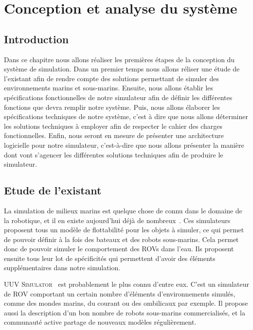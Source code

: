 \chapter{Conception et analyse du système}
\label{chapitre:systeme}

    \section{Introduction}

        Dans ce chapitre nous allons réaliser les premières étapes de la conception du système de simulation. Dans un premier temps nous allons réliser une étude de l'existant afin de rendre compte des solutions permettant de simuler des environnements marins et sous-marins. Ensuite, nous allons établir les spécifications fonctionnelles de notre simulateur afin de définir les différentes fonctions que devra remplir notre système. Puis, nous allons élaborer les spécifications techniques de notre système, c'est à dire que nous allons déterminer les solutions techniques à employer afin de respecter le cahier des charges fonctionnelles. Enfin, nous seront en mesure de présenter une architecture logicielle pour notre simulateur, c'est-à-dire que nous allons présenter la manière dont vont s'agencer les différentes solutions techniques afin de produire le simulateur.

    \section{Etude de l'existant}

        La simulation de milieux marins est quelque chose de connu dans le domaine de la robotique, et il en existe aujourd'hui déjà de nombreux~\cite{Manhaes_2016, bingham19toward, MARS, Rock}. Ces simulateurs proposent tous un modèle de flottabilité pour les objets à simuler, ce qui permet de pouvoir définir à la fois des bateaux et des robots sous-marins. Cela permet donc de pouvoir simuler le comportement des \gls{ROV}s dans l'eau. Ils proposent ensuite tous leur lot de spécificités qui permettent d'avoir des éléments supplémentaires dans notre simulation.
        
        \textsc{UUV Simulator}~\cite{Manhaes_2016} est probablement le plus connu d'entre eux. C'est un simulateur de \gls{ROV} comportant un certain nombre d'éléments d'environnements simulés, comme des mondes marins, du courant ou des ombilicaux par exemple. Il propose aussi la description d'un bon nombre de robots sous-marins commercialisés, et la communauté active partage de nouveaux modèles régulièrement.
        
